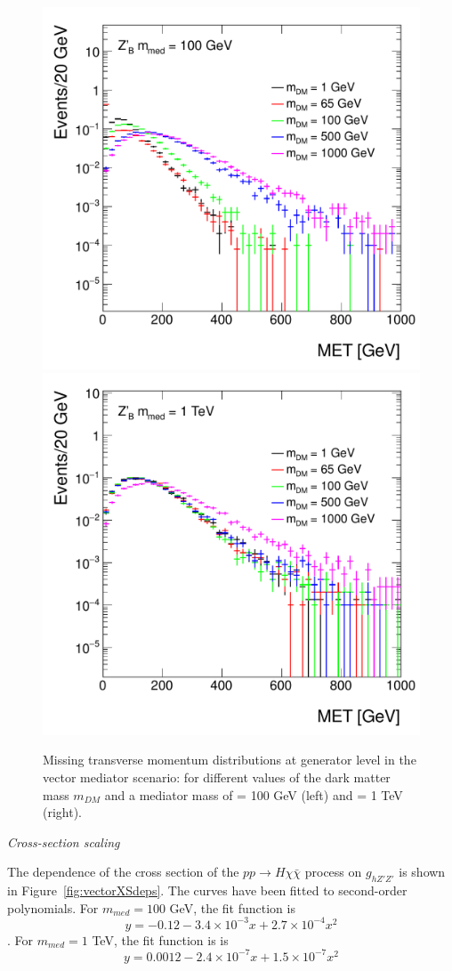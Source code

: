 \begin{figure}[hbpt!]
	\includegraphics[width=0.49\linewidth]{figures/EW/monoH/zprime_100_MET_et_Log}
	\includegraphics[width=0.49\linewidth]{figures/EW/monoH/zprime_1000_MET_et_Log}
	\caption{Missing transverse momentum distributions at generator level in the vector 
		mediator scenario: for different values of the dark matter mass $m_{DM}$ 
		and a mediator mass of \mmed = 100 GeV (left) and \mmed = 1 TeV (right).
		\label{fig:metVectorMass} }
\end{figure}

\textit{Cross-section scaling}

The dependence of the cross section of the $pp \rightarrow H\chi\bar{\chi}$ process 
on $g_{hZ'Z'}$ is shown in Figure~\ref{fig:vectorXSdeps}. 
The curves have been fitted to second-order polynomials. 
For $m_{med} = 100$ GeV, the fit function is 
$$y = -0.12 - 3.4\times10^{-3}x + 2.7\times10^{-4}x^2$$.
For $m_{med} = 1$ TeV, the fit function is 
is $$y = 0.0012 - 2.4\times10^{-7}x + 1.5\times10^{-7}x^2$$

